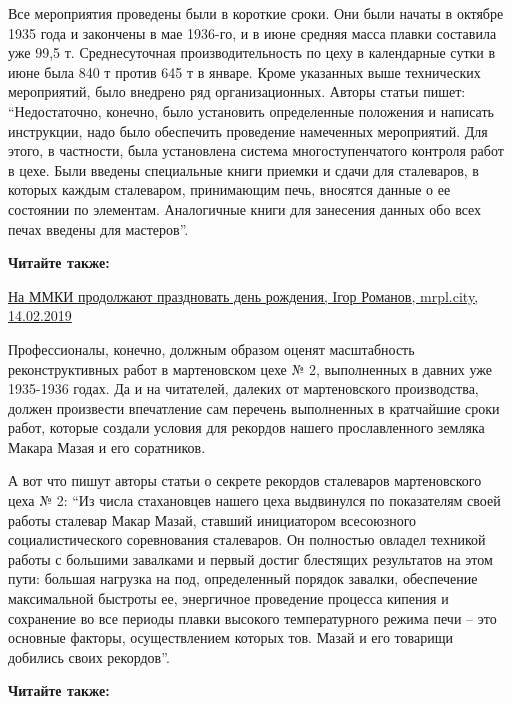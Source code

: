 Все мероприятия проведены были в короткие сроки. Они были начаты в октябре 1935
года и закончены в мае 1936-го, и в июне средняя масса плавки составила уже
99,5 т. Среднесуточная производительность по цеху в календарные сутки в июне
была 840 т против 645 т в январе. Кроме указанных выше технических мероприятий,
было внедрено ряд организационных. Авторы статьи пишет: \enquote{Недостаточно, конечно,
было установить определенные положения и написать инструкции, надо было
обеспечить проведение намеченных мероприятий. Для этого, в частности, была
установлена система многоступенчатого контроля работ в цехе. Были введены
специальные книги приемки и сдачи для сталеваров, в которых каждым сталеваром,
принимающим печь, вносятся данные о ее состоянии по элементам. Аналогичные
книги для занесения данных обо всех печах введены для мастеров}.

\vspace{0.5cm}
\begin{minipage}{0.9\textwidth}
	
\textbf{Читайте также:} 

\href{https://mrpl.city/news/view/na-mmki-prodolzhayut-prazdnovat-den-rozhdeniya-foto}{%
На ММКИ продолжают праздновать день рождения, Ігор Романов, mrpl.city, 14.02.2019}
\end{minipage}
\vspace{0.5cm}

Профессионалы, конечно, должным образом оценят масштабность реконструктивных
работ в мартеновском цехе № 2, выполненных в давних уже 1935-1936 годах. Да и
на читателей, далеких от мартеновского производства, должен произвести
впечатление сам перечень выполненных в кратчайшие сроки работ, которые создали
условия для рекордов нашего прославленного земляка Макара Мазая и его
соратников.

А вот что пишут авторы статьи о секрете рекордов сталеваров мартеновского цеха
№ 2: \enquote{Из числа стахановцев нашего цеха выдвинулся по показателям своей работы
сталевар Макар Мазай, ставший инициатором всесоюзного социалистического
соревнования сталеваров. Он полностью овладел техникой работы с большими
завалками и первый достиг блестящих результатов на этом пути: большая нагрузка
на под, определенный порядок завалки, обеспечение максимальной быстроты ее,
энергичное проведение процесса кипения и сохранение во все периоды плавки
высокого температурного режима печи – это основные факторы, осуществлением
которых тов. Мазай и его товарищи добились своих рекордов}.

\textbf{Читайте также:} 

